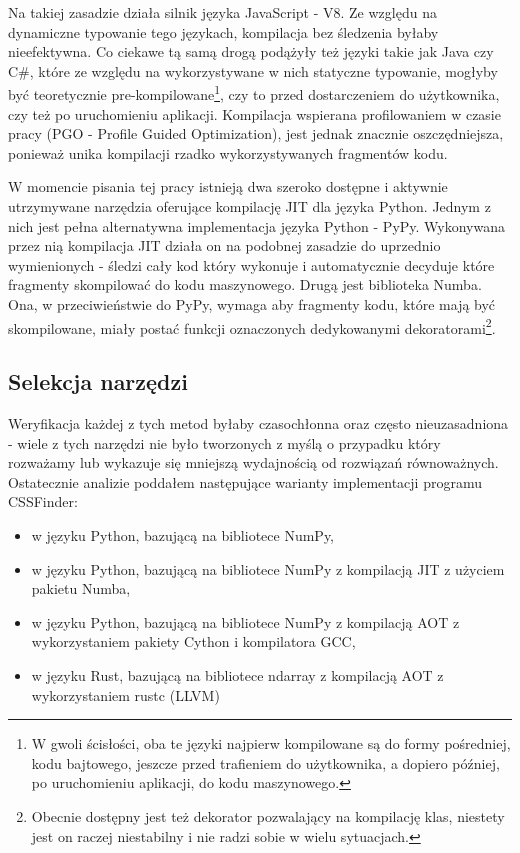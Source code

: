 \documentclass[12pt, a4paper]{article}
\begin{document}
\begin{sloppypar}
    Na takiej zasadzie działa silnik języka JavaScript - V8\cite{Java_Script_V8}. Ze względu
    na dynamiczne typowanie tego językach, kompilacja bez śledzenia byłaby nieefektywna.
    Co ciekawe tą samą drogą podążyły też języki takie jak Java czy C\#, które ze względu
    na wykorzystywane w nich statyczne typowanie, mogłyby być teoretycznie pre-kompilowane\footnote{W
    gwoli ścisłości, oba te języki najpierw kompilowane są do formy pośredniej, kodu bajtowego,
    jeszcze przed trafieniem do użytkownika, a dopiero później, po uruchomieniu
    aplikacji, do kodu maszynowego\cite{Csh_bytecode}\cite{Java_bytecode}.}, czy to
    przed dostarczeniem do użytkownika, czy też po uruchomieniu aplikacji. Kompilacja
    wspierana profilowaniem w czasie pracy (PGO - Profile Guided Optimization), jest jednak
    znacznie oszczędniejsza, ponieważ unika kompilacji rzadko wykorzystywanych
    fragmentów kodu.

    W momencie pisania tej pracy istnieją dwa szeroko dostępne i aktywnie utrzymywane
    narzędzia oferujące kompilację JIT dla języka Python. Jednym z nich jest pełna alternatywna
    implementacja języka Python - PyPy\cite{PyPy_Home_Page}. Wykonywana przez nią kompilacja
    JIT działa on na podobnej zasadzie do uprzednio wymienionych - śledzi cały kod który
    wykonuje i automatycznie decyduje które fragmenty skompilować do kodu maszynowego\cite{PyPy_JIT}.
    Drugą jest biblioteka Numba\cite{Numba_Article}\cite{Numba_Doc}. Ona, w przeciwieństwie
    do PyPy, wymaga aby fragmenty kodu, które mają być skompilowane, miały postać
    funkcji oznaczonych dedykowanymi dekoratorami\footnote{Obecnie dostępny jest też dekorator
    pozwalający na kompilację klas, niestety jest on raczej niestabilny i nie radzi
    sobie w wielu sytuacjach.}.

    \subsection{Selekcja narzędzi}


    Weryfikacja każdej z tych metod byłaby czasochłonna oraz często nieuzasadniona -
    wiele z tych narzędzi nie było tworzonych z myślą o przypadku który rozważamy lub
    wykazuje się mniejszą wydajnością od rozwiązań równoważnych. Ostatecznie analizie poddałem
    następujące warianty implementacji programu CSSFinder:
    \begin{itemize}
      \item w języku Python, bazującą na bibliotece NumPy,

      \item w języku Python, bazującą na bibliotece NumPy z kompilacją JIT z użyciem
        pakietu Numba,

      \item w języku Python, bazującą na bibliotece NumPy z kompilacją AOT z
        wykorzystaniem pakiety Cython i kompilatora GCC,

      \item w języku Rust, bazującą na bibliotece ndarray z kompilacją AOT z
        wykorzystaniem rustc (LLVM)
    \end{itemize}
  \end{sloppypar}

  \newpage
  \begin{sloppypar}
    \medskip


    \printbibliography
    [heading=bibintoc, title={Odwołania}]
  \end{sloppypar}
\end{document}
